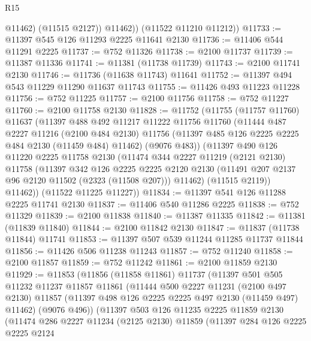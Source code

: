 \begin{lexlean}{R15}
\begin{coremodule}
              @11462)
            (@11515 @2127))
          @11462))
      (@11522 @11210 @11212))
@11733 := @11397 @545 @126 @11293 @2225 @11641 @2130
@11736 := @11406 @544 @11291 @2225
@11737 := @752 @11326
@11738 := @2100 @11737
@11739 := @11387 @11336
@11741 := @11381 (@11738 @11739)
@11743 := @2100 @11741 @2130
@11746 := @11736 (@11638 @11743) @11641
@11752 := @11397 @494 @543 @11229 @11290 @11637 @11743
@11755 := @11426 @493 @11223 @11228
@11756 := @752 @11225
@11757 := @2100 @11756
@11758 := @752 @11227
@11760 := @2100 @11758 @2130
@11828 := @11752
    (@11755
      (@11757 @11760)
      @11637
      (@11397
        @488
        @492
        @11217
        @11222
        @11756
        @11760
        (@11444
          @487
          @2227
          @11216
          (@2100 @484 @2130)
          @11756
          (@11397 @485 @126 @2225 @2225 @484 @2130 (@11459 @484) @11462)
          (@9076 @483))
        (@11397
          @490
          @126
          @11220
          @2225
          @11758
          @2130
          (@11474
            @344
            @2227
            @11219
            (@2121 @2130)
            @11758
            (@11397
              @342
              @126
              @2225
              @2225
              @2120
              @2130
              (@11491 @207 @2137 @96 @2120 @11502 (@2323 (@11508 @207)))
              @11462)
            (@11515 @2119))
          @11462))
      (@11522 @11225 @11227))
@11834 := @11397 @541 @126 @11288 @2225 @11741 @2130
@11837 := @11406 @540 @11286 @2225
@11838 := @752 @11329
@11839 := @2100 @11838
@11840 := @11387 @11335
@11842 := @11381 (@11839 @11840)
@11844 := @2100 @11842 @2130
@11847 := @11837 (@11738 @11844) @11741
@11853 := @11397 @507 @539 @11244 @11285 @11737 @11844
@11856 := @11426 @506 @11238 @11243
@11857 := @752 @11240
@11858 := @2100 @11857
@11859 := @752 @11242
@11861 := @2100 @11859 @2130
@11929 := @11853
    (@11856
      (@11858 @11861)
      @11737
      (@11397
        @501
        @505
        @11232
        @11237
        @11857
        @11861
        (@11444
          @500
          @2227
          @11231
          (@2100 @497 @2130)
          @11857
          (@11397 @498 @126 @2225 @2225 @497 @2130 (@11459 @497) @11462)
          (@9076 @496))
        (@11397
          @503
          @126
          @11235
          @2225
          @11859
          @2130
          (@11474
            @286
            @2227
            @11234
            (@2125 @2130)
            @11859
            (@11397
              @284
              @126
              @2225
              @2225
              @2124

\end{coremodule}
\end{lexlean}

